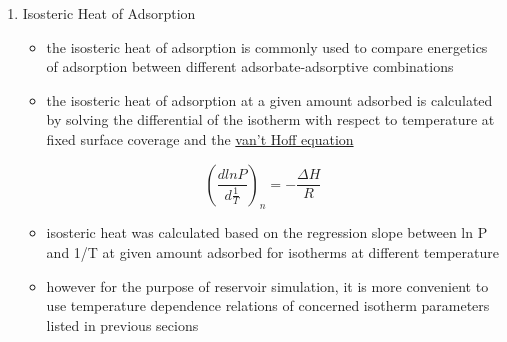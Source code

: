 \documentclass[11pt]{article}
\begin{document}
\begin{enumerate}
\item Isosteric Heat of Adsorption
\label{sec:orgc8b7e07}
\begin{itemize}
\item the isosteric heat of adsorption is commonly used to compare energetics of adsorption between different adsorbate-adsorptive combinations
\item the isosteric heat of adsorption at a given amount adsorbed is calculated by solving the differential of the isotherm with respect to temperature at fixed surface coverage and the \href{vanthoffequation.org}{van't Hoff equation}
\end{itemize}
\begin{equation}
(\frac{d ln P}{d \frac{1}{T}})_{n} = -\frac{\Delta H}{R}
\end{equation}
\begin{itemize}
\item isosteric heat was calculated based on the regression slope between ln P and 1/T at given amount adsorbed for isotherms at different temperature
\item however for the purpose of reservoir simulation, it is more convenient to use temperature dependence relations of concerned isotherm parameters listed in previous secions
\end{itemize}
\end{enumerate}
\end{document}
